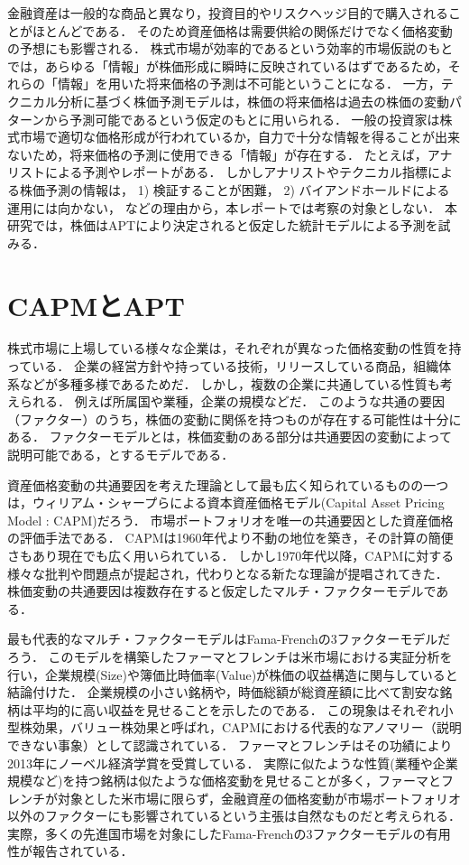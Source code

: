 ﻿\documentclass[11pt]{jreport}
\begin{document}
金融資産は一般的な商品と異なり，投資目的やリスクヘッジ目的で購入されることがほとんどである．
そのため資産価格は需要供給の関係だけでなく価格変動の予想にも影響される．
株式市場が効率的であるという効率的市場仮説のもとでは，あらゆる「情報」が株価形成に瞬時に反映されているはずであるため，それらの「情報」を用いた将来価格の予測は不可能ということになる．
一方，テクニカル分析に基づく株価予測モデルは，株価の将来価格は過去の株価の変動パターンから予測可能であるという仮定のもとに用いられる．
一般の投資家は株式市場で適切な価格形成が行われているか，自力で十分な情報を得ることが出来ないため，将来価格の予測に使用できる「情報」が存在する．
たとえば，アナリストによる予測やレポートがある．
しかしアナリストやテクニカル指標による株価予測の情報は，
1) 検証することが困難，
2) バイアンドホールドによる運用には向かない，
などの理由から，本レポートでは考察の対象としない．
本研究では，株価はAPTにより決定されると仮定した統計モデルによる予測を試みる．

\section{CAPMとAPT}
株式市場に上場している様々な企業は，それぞれが異なった価格変動の性質を持っている．
企業の経営方針や持っている技術，リリースしている商品，組織体系などが多種多様であるためだ．
しかし，複数の企業に共通している性質も考えられる．
例えば所属国や業種，企業の規模などだ．
このような共通の要因（ファクター）のうち，株価の変動に関係を持つものが存在する可能性は十分にある．
ファクターモデルとは，株価変動のある部分は共通要因の変動によって説明可能である，とするモデルである．

資産価格変動の共通要因を考えた理論として最も広く知られているものの一つは，ウィリアム・シャープらによる資本資産価格モデル(Capital Asset Pricing Model : CAPM)だろう．
市場ポートフォリオを唯一の共通要因とした資産価格の評価手法である．
CAPMは1960年代より不動の地位を築き，その計算の簡便さもあり現在でも広く用いられている．
しかし1970年代以降，CAPMに対する様々な批判や問題点が提起され，代わりとなる新たな理論が提唱されてきた．
株価変動の共通要因は複数存在すると仮定したマルチ・ファクターモデルである．


最も代表的なマルチ・ファクターモデルはFama-Frenchの3ファクターモデル\cite{Fama}だろう．
このモデルを構築したファーマとフレンチは米市場における実証分析を行い，企業規模(Size)や簿価比時価率(Value)が株価の収益構造に関与していると結論付けた．
企業規模の小さい銘柄や，時価総額が総資産額に比べて割安な銘柄は平均的に高い収益を見せることを示したのである．
この現象はそれぞれ小型株効果，バリュー株効果と呼ばれ，CAPMにおける代表的なアノマリー（説明できない事象）として認識されている．
ファーマとフレンチはその功績により2013年にノーベル経済学賞を受賞している．
実際に似たような性質(業種や企業規模など)を持つ銘柄は似たような価格変動を見せることが多く，ファーマとフレンチが対象とした米市場に限らず，金融資産の価格変動が市場ポートフォリオ以外のファクターにも影響されているという主張は自然なものだと考えられる．
実際，多くの先進国市場を対象にしたFama-Frenchの3ファクターモデルの有用性が報告されている．
\end{document}

